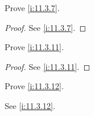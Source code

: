 \begin{ex}\label{i:ex:11.3.3}
  Prove \cref{i:11.3.7}.
\end{ex}

\begin{proof}
  See \cref{i:11.3.7}.
\end{proof}

\begin{ex}\label{i:ex:11.3.4}
  Prove \cref{i:11.3.11}.
\end{ex}

\begin{proof}
  See \cref{i:11.3.11}.
\end{proof}

\begin{ex}\label{i:ex:11.3.5}
  Prove \cref{i:11.3.12}.
\end{ex}

\begin{prop}
  See \cref{i:11.3.12}.
\end{prop}
